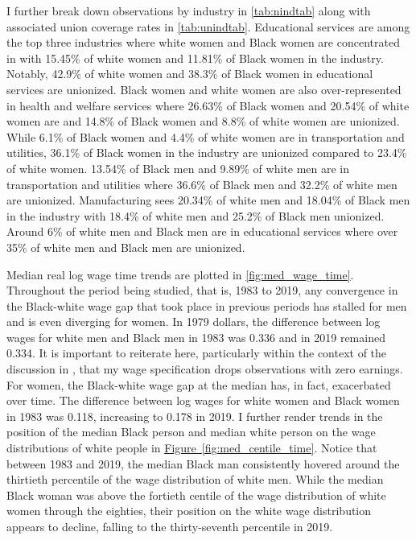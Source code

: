 \documentclass[11pt]{article}
\begin{document}
I further break down observations by industry in \autoref{tab:nindtab} along with associated union coverage rates in \autoref{tab:unindtab}. Educational services are among the top three industries where white women and Black women are concentrated in with 15.45\% of white women and 11.81\% of Black women in the industry. Notably, 42.9\% of white women and 38.3\% of Black women in educational services are unionized. Black women and white women are also over-represented in health and welfare services where 26.63\% of Black women and 20.54\% of white women are and 14.8\% of Black women and 8.8\% of white women are unionized. While 6.1\% of Black women and 4.4\% of white women are in transportation and utilities, 36.1\% of Black women in the industry are unionized compared to 23.4\% of white women. 13.54\% of Black men and 9.89\% of white men are in transportation and utilities where 36.6\% of Black men and 32.2\% of white men are unionized. Manufacturing sees 20.34\% of white men and 18.04\% of Black men in the industry with 18.4\% of white men and 25.2\% of Black men unionized. Around 6\% of white men and Black men are in educational services where over 35\% of white men and Black men are unionized. 

Median real log wage time trends are plotted in \autoref{fig:med_wage_time}. Throughout the period being studied, that is, 1983 to 2019, any convergence in the Black-white wage gap that took place in previous periods has stalled for men and is even diverging for women. In 1979 dollars, the difference between log wages for white men and Black men in 1983 was 0.336 and in 2019 remained 0.334. It is important to reiterate here, particularly within the context of the discussion in \citet{bayercharles2018}, that my wage specification drops observations with zero earnings. For women, the Black-white wage gap at the median has, in fact, exacerbated over time. The difference between log wages for white women and Black women in 1983 was 0.118, increasing to 0.178 in 2019. I further render trends in the position of the median Black person and median white person on the wage distributions of white people in \hyperref[fig:med_centile_time]{Figure~\ref*{fig:med_centile_time}}. Notice that between 1983 and 2019, the median Black man consistently hovered around the thirtieth percentile of the wage distribution of white men. While the median Black woman was above the fortieth centile of the wage distribution of white women through the eighties, their position on the white wage distribution appears to decline, falling to the thirty-seventh percentile in 2019.
\end{document}

